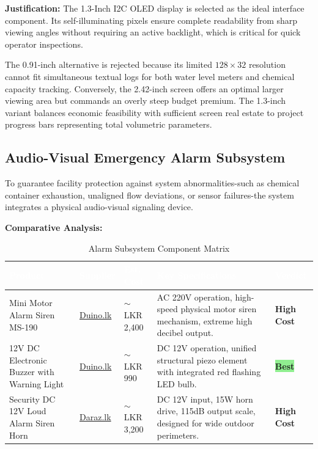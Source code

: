 \documentclass[12pt,a4paper]{article}
\newcommand{\badgegreen}[1]{%
  \colorbox{lightgreen}{\textcolor{badgegreen}{\footnotesize\textbf{#1}}}%
}
\newcommand{\badgeamber}[1]{%
  \colorbox{lightamber}{\textcolor{badgeamber}{\footnotesize\textbf{#1}}}%
}
\begin{document}
\noindent\textbf{Justification:} The 1.3-Inch I2C OLED display is selected as the ideal interface component. Its self-illuminating pixels ensure complete readability from sharp viewing angles without requiring an active backlight, which is critical for quick operator inspections. 

The 0.91-inch alternative is rejected because its limited $128\times32$ resolution cannot fit simultaneous textual logs for both water level meters and chemical capacity tracking. Conversely, the 2.42-inch screen offers an optimal larger viewing area but commands an overly steep budget premium. The 1.3-inch variant balances economic feasibility with sufficient screen real estate to project progress bars representing total volumetric parameters.

\newpage
\subsection{Audio-Visual Emergency Alarm Subsystem}

To guarantee facility protection against system abnormalities-such as chemical container exhaustion, unaligned flow deviations, or sensor failures-the system integrates a physical audio-visual signaling device.

\vspace{0.3cm}
\noindent\textbf{Comparative Analysis:}

\begin{table}[H]
\centering
\setlength{\tabcolsep}{5pt}
\renewcommand{\arraystretch}{1.4}
\begin{tabular}{|p{3.2cm}|p{3.5cm}|p{2.2cm}|p{3.5cm}|p{2cm}|}
\hline
\rowcolor{headerblue}
\textcolor{white}{\textbf{Product}} &
\textcolor{white}{\textbf{Supplier}} &
\textcolor{white}{\textbf{Est. Cost}} &
\textcolor{white}{\textbf{Key Specifications}} &
\textcolor{white}{\textbf{Verdict}} \\
\hline

Mini Motor Alarm Siren MS-190 &
\href{https://www.duino.lk/product/mimi-motor-alarm-siren-ms-190-220v/}{Duino.lk} &
$\sim$LKR 2,400 &
AC 220V operation, high-speed physical motor siren mechanism, extreme high decibel output. &
\badgeamber{High Cost} \\
\hline
\rowcolor{chosen}
12V DC Electronic Buzzer with Warning Light &
\href{https://www.duino.lk/product/12dc-electronic-buzzer-with-warning-light/}{Duino.lk} &
$\sim$LKR 990 &
DC 12V operation, unified structural piezo element with integrated red flashing LED bulb. &
\badgegreen{Best} \\
\hline
Security DC 12V Loud Alarm Siren Horn &
\href{https://www.daraz.lk/products/security-dc-12v-outdoor-alarm-siren-wire-loud-alarm-horn-115db-exterior-sirena-alarma-speaker-for-alarm-system-15w-i245753951-s1497497382.html}{Daraz.lk} &
$\sim$LKR 3,200 &
DC 12V input, 15W horn drive, 115dB output scale, designed for wide outdoor perimeters. &
\badgeamber{High Cost} \\
\hline
\end{tabular}
\caption{Alarm Subsystem Component Matrix}
\end{table}
\end{document}

